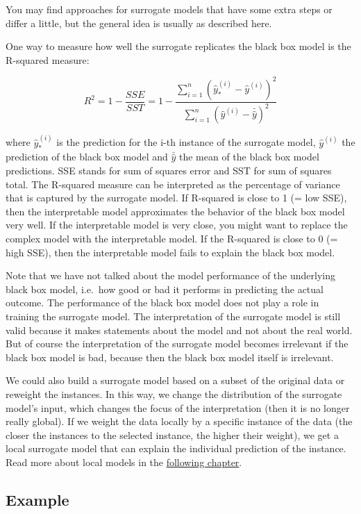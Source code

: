 \documentclass[
  11pt,
]{scrbook}
\begin{document}
You may find approaches for surrogate models that have some extra steps or differ a little, but the general idea is usually as described here.

One way to measure how well the surrogate replicates the black box model is the R-squared measure:

\[R^2=1-\frac{SSE}{SST}=1-\frac{\sum_{i=1}^n(\hat{y}_*^{(i)}-\hat{y}^{(i)})^2}{\sum_{i=1}^n(\hat{y}^{(i)}-\bar{\hat{y}})^2}\]

where \(\hat{y}_*^{(i)}\) is the prediction for the i-th instance of the surrogate model, \(\hat{y}^{(i)}\) the prediction of the black box model and \(\bar{\hat{y}}\) the mean of the black box model predictions.
SSE stands for sum of squares error and SST for sum of squares total.
The R-squared measure can be interpreted as the percentage of variance that is captured by the surrogate model.
If R-squared is close to 1 (= low SSE), then the interpretable model approximates the behavior of the black box model very well.
If the interpretable model is very close, you might want to replace the complex model with the interpretable model.
If the R-squared is close to 0 (= high SSE), then the interpretable model fails to explain the black box model.

Note that we have not talked about the model performance of the underlying black box model, i.e.~how good or bad it performs in predicting the actual outcome.
The performance of the black box model does not play a role in training the surrogate model.
The interpretation of the surrogate model is still valid because it makes statements about the model and not about the real world.
But of course the interpretation of the surrogate model becomes irrelevant if the black box model is bad, because then the black box model itself is irrelevant.

We could also build a surrogate model based on a subset of the original data or reweight the instances.
In this way, we change the distribution of the surrogate model's input, which changes the focus of the interpretation (then it is no longer really global).
If we weight the data locally by a specific instance of the data (the closer the instances to the selected instance, the higher their weight), we get a local surrogate model that can explain the individual prediction of the instance.
Read more about local models in the \protect\hyperlink{lime}{following chapter}.

\hypertarget{example-3}{%
\subsection{Example}\label{example-3}}
\end{document}
